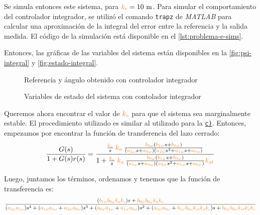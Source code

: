 Se simula entonces este sistema, para $\nara{k_{c}} = 10\ \unit{m}$. Para simular
el comportamiento del controlador integrador, se utilizó el comando \verb|trapz|
de \textit{MATLAB} para calcular una aproximación de la integral del error entre
la referencia y la salida medida. El código de la simulación está disponible en
el \autoref{lst:problema-e-sims}.

Entonces, las gráficas de las variables del sistema están disponibles en la
\autoref{fig:psi-integral} y \autoref{fig:estado-integral}.

\begin{figure}[h]
  \centering
  
  \caption{Referencia y ángulo obtenido con controlador integrador}\label{fig:psi-integral}
\end{figure}

\begin{figure}[h]
  \centering
  
  \caption{Variables de estado del sistema con contolador integrador}\label{fig:estado-integral}
\end{figure}

\FloatBarrier

Queremos ahora encontrar el valor de $\nara{k_c}$ para que el sistema sea
marginalmente estable. El procedimiento utilizado es similar al utilizado para la
\hyperref[pregunta-c]{\texttt{c)}}. Entonces, empezamos por encontrar la función
de transferencia del lazo cerrado:
\begin{equation}
  \frac{G(s)}{1 + G(s)r(s)} = \dfrac{\frac{\nara{k_c}}{s}\nara{k_a} \frac{\nara{\nara{b_{0\omega}}}\left(\nara{b_{1\psi}}s + \nara{b_{0\psi}}\right)}
  {\left(\nara{a_{1\omega}}s + \nara{a_{0\omega}}\right)\left(\nara{a_{2\psi}}s^{2} + \nara{a_{1\psi}}s + \nara{a_{0\psi}}\right)}}
  {1+\frac{\nara{k_c}}{s} \nara{k_a} \frac{\nara{\nara{b_{0\omega}}}\left(\nara{b_{1\psi}}s + \nara{b_{0\psi}}\right)}
  {\left(\nara{a_{1\omega}}s + \nara{a_{0\omega}}\right)\left(\nara{a_{2\psi}}s^{2} + \nara{a_{1\psi}}s + \nara{a_{0\psi}}\right)}\nara{k_{st}}}
\end{equation}

Luego, juntamos los términos, ordenamos y tenemos que la función de transferencia
es:
\begin{equation}
  \dfrac{(\nara{b_{1\psi} b_{0\omega} k_a k_c})s + \nara{b_{0\psi} b_{0\omega} k_a k_c}}
  {(\nara{a_{2\psi} a_{1\omega}}) s^4 +
  (\nara{a_{1\psi} a_{1\omega}} + \nara{a_{2\psi} a_{0\omega}}) s^3 + 
  (\nara{a_{0\psi} a_{1\omega}} + \nara{a_{1\psi} a_{0\omega}}) s^2 + 
  (\nara{a_{0\psi} a_{0\omega}} + \nara{b_{1\psi} b_{0\omega}k_{st} k_a k_c})s+ 
  \nara{b_{0\psi} b_{0\omega} k_{st} k_a k_c}}
\end{equation}

